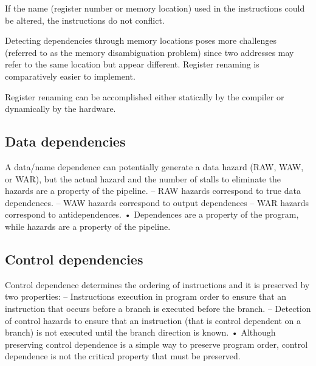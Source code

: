 If the name (register number or memory location) used in the instructions could be altered, the instructions do not conflict.

Detecting dependencies through memory locations poses more challenges (referred to as the memory disambiguation problem) since two addresses may refer to the same location but appear different. 
Register renaming is comparatively easier to implement.

Register renaming can be accomplished either statically by the compiler or dynamically by the hardware.

\subsection{Data dependencies}
A data/name dependence can potentially generate
a data hazard (RAW, WAW, or WAR), but the actual
hazard and the number of stalls to eliminate the
hazards are a property of the pipeline.
– RAW hazards correspond to true data dependences.
– WAW hazards correspond to output dependences
– WAR hazards correspond to antidependences.
• Dependences are a property of the program, while
hazards are a property of the pipeline.

\subsection{Control dependencies}
Control dependence determines the ordering of
instructions and it is preserved by two properties:
– Instructions execution in program order to ensure
that an instruction that occurs before a branch is
executed before the branch.
– Detection of control hazards to ensure that an
instruction (that is control dependent on a branch) is
not executed until the branch direction is known.
• Although preserving control dependence is a
simple way to preserve program order, control
dependence is not the critical property that must be
preserved.




